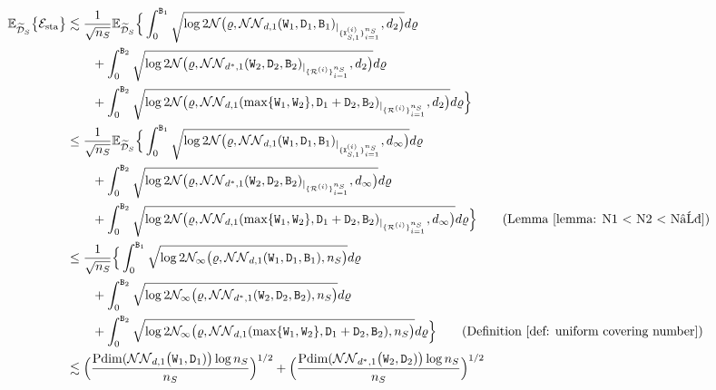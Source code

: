     \begin{align*}
   \E_{\widetilde{\mathcal{D}}_S}\big\{\mathcal{E}_{\mathrm{sta}}\big\} &\lesssim \frac{1}{\sqrt{n_S}}\E_{\widetilde{\mathcal{D}}_S}\Big\{\int_0^{\mathtt{B}_1}\sqrt{\log2\mathcal{N}\big(\varrho, \mathcal{NN}_{d,1}(\mathtt{W}_1, \mathtt{D}_1, \mathtt{B}_1)_{\vert_{\{\mathtt{X}^{(i)}_{S,1}\}_{i=1}^{n_S}}}, d_2\big)}d\varrho \nonumber\\
    &\qquad+ \int_0^{\mathtt{B}_2}\sqrt{\log2\mathcal{N}\big(\varrho, \mathcal{NN}_{d^*,1}(\mathtt{W}_2, \mathtt{D}_2, \mathtt{B}_2)_{\vert_{\{\mathcal{R}^{(i)}\}_{i=1}^{n_S}}}, d_2\big)}d\varrho \nonumber\\
    &\qquad+ \int_0^{\mathtt{B}_2}\sqrt{\log2\mathcal{N}\big(\varrho, \mathcal{NN}_{d,1}(\max\{\mathtt{W}_1, \mathtt{W}_2\}, \mathtt{D}_1 + \mathtt{D}_2, \mathtt{B}_2)_{\vert_{\{\mathcal{R}^{(i)}\}_{i=1}^{n_S}}}, d_2\big)}d\varrho
    \Big\}\\
    &\leq \frac{1}{\sqrt{n_S}}\E_{\widetilde{\mathcal{D}}_S}\Big\{\int_0^{\mathtt{B}_1}\sqrt{\log2\mathcal{N}\big(\varrho, \mathcal{NN}_{d,1}(\mathtt{W}_1, \mathtt{D}_1, \mathtt{B}_1)_{\vert_{\{\mathtt{X}^{(i)}_{S,1}\}_{i=1}^{n_S}}}, d_\infty\big)}d\varrho \nonumber\\
    &\qquad+ \int_0^{\mathtt{B}_2}\sqrt{\log2\mathcal{N}\big(\varrho, \mathcal{NN}_{d^*,1}(\mathtt{W}_2, \mathtt{D}_2, \mathtt{B}_2)_{\vert_{\{\mathcal{R}^{(i)}\}_{i=1}^{n_S}}}, d_\infty\big)}d\varrho \nonumber\\
    &\qquad+ \int_0^{\mathtt{B}_2}\sqrt{\log2\mathcal{N}\big(\varrho, \mathcal{NN}_{d,1}(\max\{\mathtt{W}_1, \mathtt{W}_2\}, \mathtt{D}_1 + \mathtt{D}_2, \mathtt{B}_2)_{\vert_{\{\mathcal{R}^{(i)}\}_{i=1}^{n_S}}}, d_\infty\big)}d\varrho
    \Big\} \tag{Lemma~\ref{lemma: N1 < N2 < N∞}}\\
    &\leq \frac{1}{\sqrt{n_S}}\Big\{\int_0^{\mathtt{B}_1}\sqrt{\log2\mathcal{N}_\infty\big(\varrho, \mathcal{NN}_{d,1}(\mathtt{W}_1, \mathtt{D}_1, \mathtt{B}_1), n_S\big)}d\varrho \nonumber\\
    &\qquad+ \int_0^{\mathtt{B}_2}\sqrt{\log2\mathcal{N}_\infty\big(\varrho, \mathcal{NN}_{d^*,1}(\mathtt{W}_2, \mathtt{D}_2, \mathtt{B}_2), n_S\big)}d\varrho \nonumber\\
    &\qquad+ \int_0^{\mathtt{B}_2}\sqrt{\log2\mathcal{N}_\infty\big(\varrho, \mathcal{NN}_{d,1}(\max\{\mathtt{W}_1, \mathtt{W}_2\}, \mathtt{D}_1 + \mathtt{D}_2, \mathtt{B}_2), n_S\big)}d\varrho\Big\} \tag{Definition~\ref{def: uniform covering number}}\\
    &\lesssim  \Big(\frac{\mathrm{Pdim}(\mathcal{NN}_{d,1}\big(\mathtt{W}_1, \mathtt{D}_1)\big)\log n_S}{n_S}\Big)^{1/2} + \Big(\frac{\mathrm{Pdim}(\mathcal{NN}_{d^*,1}\big(\mathtt{W}_2, \mathtt{D}_2)\big)\log n_S}{n_S}\Big)^{1/2} \nonumber\\

\end{align*}
